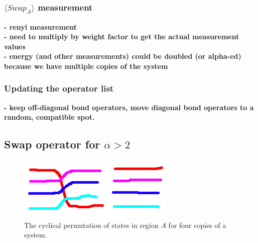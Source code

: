 \documentclass[prb,aps,twocolumn,floatfix,amsmath,amssymb,superscriptaddress,tightenlines]{revtex4}
\begin{document}
\subsubsection{$\langle Swap_A \rangle$ measurement}
\noindent
{\bf 
- renyi measurement \\
- need to multiply by weight factor to get the actual measurement values\\
- energy (and other measurements) could be doubled (or alpha-ed) because we have multiple copies of the system
}
\subsubsection{Updating the operator list}
\noindent
{\bf- keep off-diagonal bond operators, move diagonal bond operators to a random, compatible spot.}
	
\subsection{Swap operator for $\alpha > 2$}

\begin{figure} {
\includegraphics[width=2.4 in]{swap.png} \caption{ 
\label{swap_4} 
The cyclical permutation of states in region $A$ for four copies of a system.
}
} \end{figure}


\end{document}
